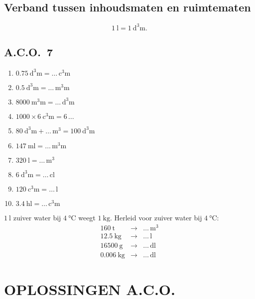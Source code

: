 \documentclass[a4paper,12pt]{article}
\begin{document}
\subsection{Verband tussen inhoudsmaten en ruimtematen}
\[\SI{1}{\litre}=\SI{1}{\cubic\deci\metre}.\]

\subsection*{A.C.O.~7}
\begin{multicols}{2}
\begin{enumerate}
  \item \(\SI{0.75}{\cubic\deci\metre}=\ldots\,\si{\cubic\centi\metre}\)
  \item \(\SI{0.5}{\cubic\deci\metre}=\ldots\,\si{\cubic\milli\metre}\)
  \item \(\SI{8000}{\cubic\milli\metre}=\ldots\,\si{\cubic\deci\metre}\)
  \item \(\num{1000}\times \SI{6}{\cubic\centi\metre}=6\,\ldots\)
  \item \(\SI{80}{\cubic\deci\metre}+\ldots\,\si{\cubic\metre}=\SI{100}{\cubic\deci\metre}\)
  \item \(\SI{147}{\milli\litre}=\ldots\,\si{\cubic\milli\metre}\)
  \item \(\SI{320}{\litre}=\ldots\,\si{\cubic\metre}\)
  \item \(\SI{6}{\cubic\deci\metre}=\ldots\,\si{\centi\litre}\)
  \item \(\SI{120}{\cubic\centi\metre}=\ldots\,\si{\litre}\)
  \item \(\SI{3.4}{\hecto\litre}=\ldots\,\si{\cubic\centi\metre}\)
\end{enumerate}
\end{multicols}

\(\SI{1}{\litre}\) zuiver water bij \(\SI{4}{\celsius}\) weegt \(\SI{1}{\kilo\gram}\). Herleid voor zuiver water bij \(\SI{4}{\celsius}\):
\[
\begin{array}{rcl}
\SI{160}{\tonne} & \to & \ldots\,\si{\cubic\metre} \\
\SI{12.5}{\kilo\gram} & \to & \ldots\,\si{\litre} \\
\SI{16500}{\gram} & \to & \ldots\,\si{\deci\litre} \\
\SI{0.006}{\kilo\gram} & \to & \ldots\,\si{\deci\litre}
\end{array}
\]

\section*{OPLOSSINGEN A.C.O.}
\end{document}
